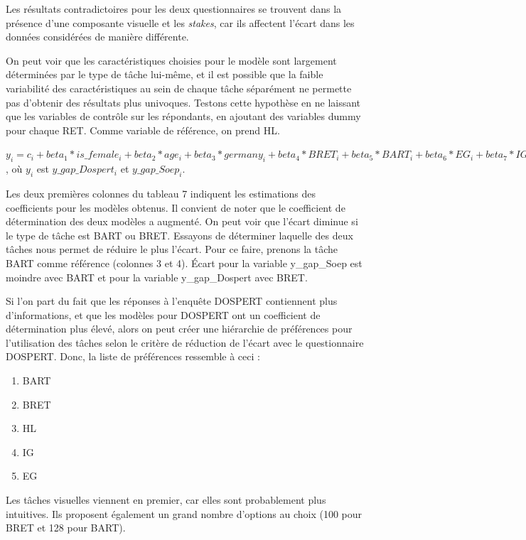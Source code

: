 \documentclass[12pt]{article}
\providecommand{\tightlist}{%
  \setlength{\itemsep}{0pt}\setlength{\parskip}{0pt}}
\begin{document}
Les résultats contradictoires pour les deux questionnaires se trouvent
dans la présence d'une composante visuelle et les \emph{stakes}, car ils
affectent l'écart dans les données considérées de manière différente.

On peut voir que les caractéristiques choisies pour le modèle sont
largement déterminées par le type de tâche lui-même, et il est possible
que la faible variabilité des caractéristiques au sein de chaque tâche
séparément ne permette pas d'obtenir des résultats plus univoques.
Testons cette hypothèse en ne laissant que les variables de contrôle sur
les répondants, en ajoutant des variables dummy pour chaque RET. Comme
variable de référence, on prend HL.

\(y_i = c_i + beta_1 * is\_female_i+ beta_2 * age_i + beta_3 * germany_i + beta_4 * BRET_i + beta_5 * BART_i + beta_6 * EG_i + beta_7 * IG_i + epsilon_i\)
, où \(y_i\) est \(y\_gap\_Dospert_i\) et \(y\_gap\_Soep_i\).

Les deux premières colonnes du tableau 7 indiquent les estimations des
coefficients pour les modèles obtenus. Il convient de noter que le
coefficient de détermination des deux modèles a augmenté. On peut voir
que l'écart diminue si le type de tâche est BART ou BRET. Essayons de
déterminer laquelle des deux tâches nous permet de réduire le plus
l'écart. Pour ce faire, prenons la tâche BART comme référence (colonnes
3 et 4). Écart pour la variable y\_gap\_Soep est moindre avec BART et
pour la variable y\_gap\_Dospert avec BRET.

Si l'on part du fait que les réponses à l'enquête DOSPERT contiennent
plus d'informations, et que les modèles pour DOSPERT ont un coefficient
de détermination plus élevé, alors on peut créer une hiérarchie de
préférences pour l'utilisation des tâches selon le critère de réduction
de l'écart avec le questionnaire DOSPERT. Donc, la liste de préférences
ressemble à ceci :

\begin{enumerate}
\def\labelenumi{\arabic{enumi}.}
\tightlist
\item
  BART
\item
  BRET
\item
  HL
\item
  IG
\item
  EG
\end{enumerate}

Les tâches visuelles viennent en premier, car elles sont probablement
plus intuitives. Ils proposent également un grand nombre d'options au
choix (100 pour BRET et 128 pour BART).
\end{document}
